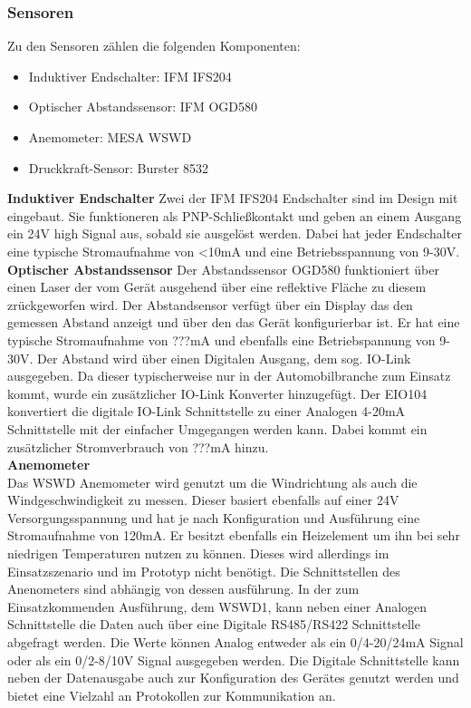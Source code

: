 \subsubsection{Sensoren}
Zu den Sensoren zählen die folgenden Komponenten:
\begin{itemize}
	\item Induktiver Endschalter: IFM IFS204
	\item Optischer Abstandssensor: IFM OGD580
	\item Anemometer: MESA WSWD
	\item Druckkraft-Sensor: Burster 8532
\end{itemize}

\noindent\textbf{Induktiver Endschalter}\newline
Zwei der IFM IFS204 Endschalter sind im Design mit eingebaut. Sie funktioneren als PNP-Schließkontakt und geben an einem Ausgang ein 24V high Signal aus, sobald sie ausgelöst werden. Dabei hat jeder Endschalter eine typische Stromaufnahme von <10mA und eine Betriebsspannung von 9-30V.\\

\noindent\textbf{Optischer Abstandssensor}\newline
Der Abstandssensor OGD580 funktioniert über einen Laser der vom Gerät ausgehend über eine reflektive Fläche zu diesem zrückgeworfen wird. Der Abstandsensor verfügt über ein Display das den gemessen Abstand anzeigt und über den das Gerät konfigurierbar ist. Er hat eine typische Stromaufnahme von ???mA und ebenfalls eine Betriebspannung von 9-30V. Der Abstand wird über einen Digitalen Ausgang, dem sog. IO-Link ausgegeben. Da dieser typischerweise nur in der Automobilbranche zum Einsatz kommt, wurde ein zusätzlicher IO-Link Konverter hinzugefügt. Der EIO104 konvertiert die digitale IO-Link Schnittstelle zu einer Analogen 4-20mA Schnittstelle mit der einfacher Umgegangen werden kann. Dabei kommt ein zusätzlicher Stromverbrauch von ???mA hinzu.\\

\noindent\textbf{Anemometer}\\
Das WSWD Anemometer wird genutzt um die Windrichtung als auch die Windgeschwindigkeit zu messen. Dieser basiert ebenfalls auf einer 24V Versorgungsspannung und hat je nach Konfiguration und Ausführung eine Stromaufnahme von 120mA. Er besitzt ebenfalls ein Heizelement um ihn bei sehr niedrigen Temperaturen nutzen zu können. Dieses wird allerdings im Einsatzszenario und im Prototyp nicht benötigt. Die Schnittstellen des Anenometers sind abhängig von dessen ausführung. In der zum Einsatzkommenden Ausführung, dem WSWD1, kann neben einer Analogen Schnittstelle die Daten auch über eine Digitale RS485/RS422 Schnittstelle abgefragt werden. Die Werte können Analog entweder als ein 0/4-20/24mA Signal oder als ein 0/2-8/10V Signal ausgegeben werden. Die Digitale Schnittstelle kann neben der Datenausgabe auch zur Konfiguration des Gerätes genutzt werden und bietet eine Vielzahl an Protokollen zur Kommunikation an.\\

